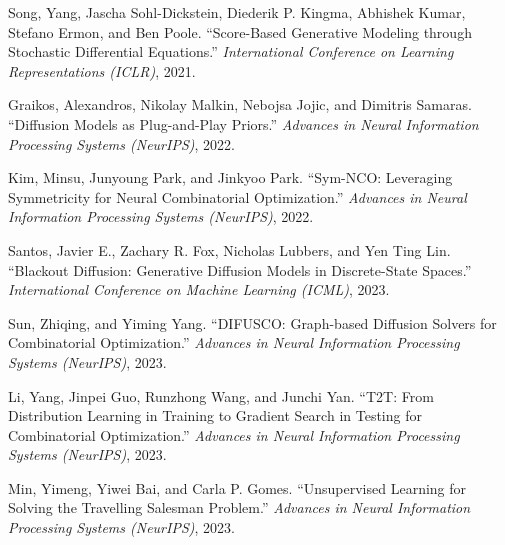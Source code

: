 \begin{thebibliography}{}
Song, Yang, Jascha Sohl-Dickstein, Diederik P. Kingma, Abhishek Kumar, Stefano Ermon, and Ben Poole. ``Score-Based Generative Modeling through Stochastic Differential Equations.'' \textit{International Conference on Learning Representations (ICLR)}, 2021.

Graikos, Alexandros, Nikolay Malkin, Nebojsa Jojic, and Dimitris Samaras. ``Diffusion Models as Plug-and-Play Priors.'' \textit{Advances in Neural Information Processing Systems (NeurIPS)}, 2022.

Kim, Minsu, Junyoung Park, and Jinkyoo Park. ``Sym-NCO: Leveraging Symmetricity for Neural Combinatorial Optimization.'' \textit{Advances in Neural Information Processing Systems (NeurIPS)}, 2022.

Santos, Javier E., Zachary R. Fox, Nicholas Lubbers, and Yen Ting Lin. ``Blackout Diffusion: Generative Diffusion Models in Discrete-State Spaces.'' \textit{International Conference on Machine Learning (ICML)}, 2023.

Sun, Zhiqing, and Yiming Yang. ``DIFUSCO: Graph-based Diffusion Solvers for Combinatorial Optimization.'' \textit{Advances in Neural Information Processing Systems (NeurIPS)}, 2023.

Li, Yang, Jinpei Guo, Runzhong Wang, and Junchi Yan. ``T2T: From Distribution Learning in Training to Gradient Search in Testing for Combinatorial Optimization.'' \textit{Advances in Neural Information Processing Systems (NeurIPS)}, 2023.

Min, Yimeng, Yiwei Bai, and Carla P. Gomes. ``Unsupervised Learning for Solving the Travelling Salesman Problem.'' \textit{Advances in Neural Information Processing Systems (NeurIPS)}, 2023.

\end{thebibliography}
